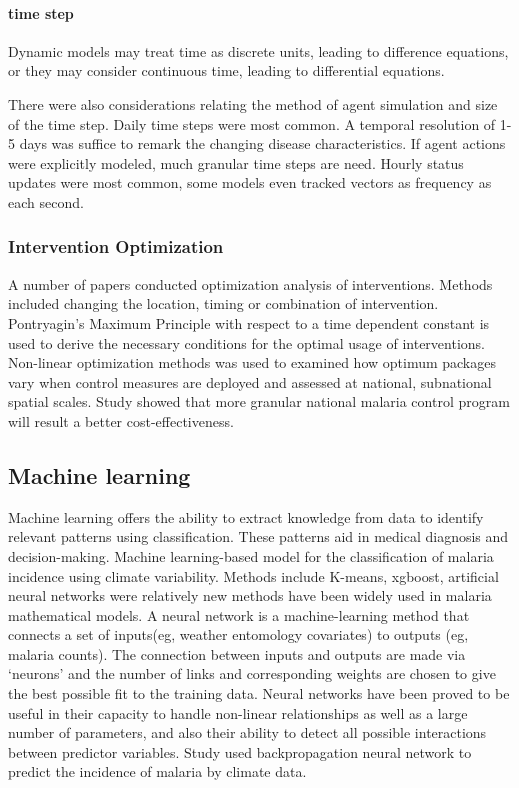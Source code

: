 \documentclass[a4paper, 12pt, twoside]{article}
\begin{document}
\paragraph{time step}%
\label{par:time_step}
Dynamic models may treat time as discrete units, leading to difference equations, or they may consider continuous time, leading to differential equations.

There were also considerations relating the method of agent simulation and size of the time step.
Daily time steps were most common.
A temporal resolution of 1-5 days was suffice to remark the changing disease characteristics.
If agent actions were explicitly modeled, much granular time steps are need.
Hourly status updates were most common, some models even tracked vectors as frequency as each second.

\subsubsection{Intervention Optimization}
A number of papers\cite{Tchoumi2020,Smith2008,Cameron2015,Winskill2019} conducted optimization analysis of interventions.
Methods included changing the location, timing or combination of intervention.
Pontryagin’s Maximum Principle\cite{Tchoumi2020} with respect to a time dependent constant is used to derive the necessary conditions for the optimal usage of interventions.
Non-linear optimization methods\cite{Walker2016} was used to examined how optimum packages vary when control measures are deployed and assessed at national, subnational spatial scales.
Study showed that more granular national malaria control program will result a better cost-effectiveness\cite{Walker2016}.

\subsection{Machine learning}%
\label{sub:machine_learning}
Machine learning offers the ability to extract knowledge from data to identify relevant patterns using classification. These patterns aid in medical diagnosis and decision-making.
Machine learning-based model for the classification of malaria incidence using climate variability.
Methods include K-means, \gls{xgboost}, artificial neural networks were relatively new methods have been widely used in malaria mathematical models.
A neural network is a machine-learning method that connects a set of inputs(eg, weather entomology covariates) to outputs (eg, malaria counts).
The connection between inputs and outputs are made via ‘neurons’ and the number of links and corresponding weights are chosen to give the best possible fit to the training data.
Neural networks have been proved to be useful in their capacity to handle non-linear relationships as well as a large number of parameters, and also their ability to detect all possible interactions between predictor variables.
Study\cite{Verma2020} used backpropagation neural network to predict the incidence of malaria by climate data.
\end{document}
